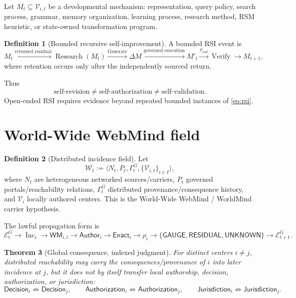 \documentclass[10pt]{article}
\theoremstyle{venus}
\newtheorem{theorem}{Theorem}
\theoremstyle{definition}
\newtheorem{definition}[theorem]{Definition}
\newcommand{\Research}{\operatorname{Research}}
\newcommand{\Generate}{\operatorname{Generate}}
\newcommand{\Verify}{\operatorname{Verify}}
\newcommand{\Inc}{\operatorname{Inc}}
\newcommand{\WM}{\mathsf{WM}}
\newcommand{\Author}{\mathsf{Author}}
\newcommand{\Enact}{\mathsf{Enact}}
\newcommand{\GaugeState}{\mathsf{GAUGE}}
\newcommand{\ResidualState}{\mathsf{RESIDUAL}}
\newcommand{\UnknownState}{\mathsf{UNKNOWN}}
\begin{document}
Let $M_t\subseteq\mathcal V_{i,t}$ be a developmental mechanism: representation,
query policy, search process, grammar, memory organization, learning process,
research method, RSM heuristic, or state-owned transformation program.

\begin{definition}[Bounded recursive self-improvement]
A bounded RSI event is
\begin{equation}\label{eq:rsi}
M_t
\xrightarrow{\text{returned residual}}
\Research(M_t)
\xrightarrow{\Generate}
\Delta M
\xrightarrow{\text{governed execution}}
M'_t
\xrightarrow{\rho_{ind}}
\Verify
\xrightarrow{}
M_{t+1},
\end{equation}
where retention occurs only after the independently sourced return.
\end{definition}

Thus
\[
\boxed{
\text{self-revision}\neq\text{self-authorization}\neq\text{self-validation}.
}
\]
Open-ended RSI requires evidence beyond repeated bounded instances of
\eqref{eq:rsi}.

\section{World-Wide WebMind field}

\begin{definition}[Distributed incidence field]
Let
\begin{equation}\label{eq:webmind}
\mathcal W_t
:=
\langle
N_t,P_t,\Gamma^G_t,\{\mathcal V_{i,t}\}_{i\in I}
\rangle,
\end{equation}
where $N_t$ are heterogeneous networked sources/carriers, $P_t$ governed
portals/reachability relations, $\Gamma^G_t$ distributed provenance/consequence
history, and $\mathcal V_i$ locally authored centers. This is the
World-Wide WebMind / WorldMind carrier hypothesis.
\end{definition}

The lawful propagation form is
\begin{equation}\label{eq:worldmindcycle}
\mathcal E^G_t
\to \Inc_i
\to \WM_{i,t}
\to \Author_i
\to \Enact_i
\to \rho_i
\to \{\GaugeState,\ResidualState,\UnknownState\}
\to \mathcal E^G_{t+1}.
\end{equation}

\begin{theorem}[Global consequence, indexed judgment]
For distinct centers $i\neq j$, distributed reachability may carry the
consequences/provenance of $i$ into later incidence at $j$, but it does not by
itself transfer local authorship, decision, authorization, or jurisdiction:
\begin{equation}\label{eq:noninherit}
\mathsf{Decision}_i\not\Rightarrow\mathsf{Decision}_j,
\qquad
\mathsf{Authorization}_i\not\Rightarrow\mathsf{Authorization}_j,
\qquad
\mathsf{Jurisdiction}_i\not\Rightarrow\mathsf{Jurisdiction}_j.
\end{equation}
\end{theorem}
\end{document}
